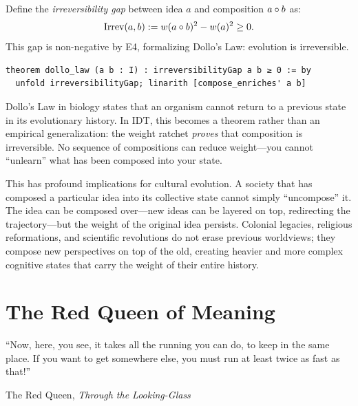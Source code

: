 \begin{definition}
\label{def:dollo}
Define the \emph{irreversibility gap} between idea $a$ and composition
$a \circ b$ as:
\[
  \text{Irrev}(a, b) := w(a \circ b)^2 - w(a)^2 \geq 0.
\]
This gap is non-negative by E4, formalizing Dollo's Law: evolution is
irreversible.

\begin{lstlisting}[caption={Lean 4: Dollo's law}]
theorem dollo_law (a b : I) : irreversibilityGap a b ≥ 0 := by
  unfold irreversibilityGap; linarith [compose_enriches' a b]
\end{lstlisting}
\end{definition}

\begin{remark}
Dollo's Law in biology states that an organism cannot return to a previous
state in its evolutionary history.  In IDT, this becomes a theorem rather
than an empirical generalization: the weight ratchet \emph{proves} that
composition is irreversible.  No sequence of compositions can reduce
weight---you cannot ``unlearn'' what has been composed into your state.

This has profound implications for cultural evolution.  A society that has
composed a particular idea into its collective state cannot simply
``uncompose'' it.  The idea can be composed over---new ideas can be
layered on top, redirecting the trajectory---but the weight of the original
idea persists.  Colonial legacies, religious reformations, and scientific
revolutions do not erase previous worldviews; they compose new perspectives
on top of the old, creating heavier and more complex cognitive states
that carry the weight of their entire history.
\end{remark}


\chapter{The Red Queen of Meaning}
\label{ch:red-queen-deep}

\epigraph{``Now, here, you see, it takes all the running you can do, to keep
in the same place.  If you want to get somewhere else, you must run at least
twice as fast as that!''}%
{The Red Queen, \emph{Through the Looking-Glass}}


